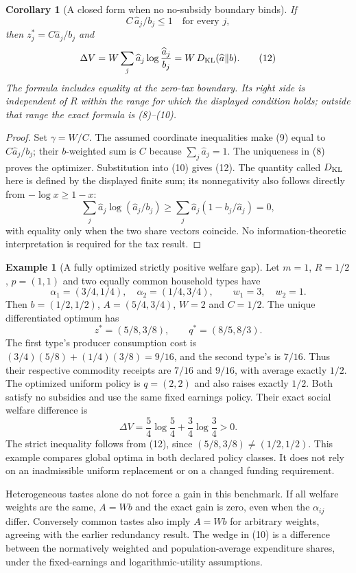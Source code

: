 \documentclass[11pt]{article}
\newtheorem{corollary}{Corollary}
\theoremstyle{definition}
\newtheorem{example}{Example}
\begin{document}
\begin{corollary}[A closed form when no no-subsidy boundary binds]
If
\[
 C\,\widehat a_j/b_j\leq1\quad\text{for every }j,
\]
then $z_j^*=C\widehat a_j/b_j$ and
\[
 \Delta V
 =W\sum_j\widehat a_j\log\frac{\widehat a_j}{b_j}
 =W\,D_{\rm KL}(\widehat a\Vert b).                        \tag{12}
\]
The formula includes equality at the zero-tax boundary. Its right side
is independent of $R$ within the range for which the displayed condition
holds; outside that range the exact formula is (8)--(10).
\end{corollary}
\begin{proof}
Set $\gamma=W/C$. The assumed coordinate inequalities make (9) equal
to $C\widehat a_j/b_j$; their $b$-weighted sum is $C$ because
$\sum_j\widehat a_j=1$. The uniqueness in (8) proves the optimizer.
Substitution into (10) gives (12). The quantity called
$D_{\rm KL}$ here is defined by the displayed finite sum; its
nonnegativity also follows directly from $-\log x\geq1-x$:
\[
 \sum_j\widehat a_j\log(\widehat a_j/b_j)
 \geq\sum_j\widehat a_j(1-b_j/\widehat a_j)=0,
\]
with equality only when the two share vectors coincide. No
information-theoretic interpretation is required for the tax result.
\end{proof}

\begin{example}[A fully optimized strictly positive welfare gap]
Let $m=1$, $R=1/2$, $p=(1,1)$ and two equally common household
types have
\[
 \alpha_1=(3/4,1/4),\quad \alpha_2=(1/4,3/4),\qquad
 w_1=3,\quad w_2=1.
\]
Then $b=(1/2,1/2)$, $A=(5/4,3/4)$, $W=2$ and $C=1/2$.
The unique differentiated optimum has
\[
 z^*=(5/8,3/8),\qquad q^*=(8/5,8/3).
\]
The first type's producer consumption cost is
$(3/4)(5/8)+(1/4)(3/8)=9/16$, and the second type's is $7/16$.
Thus their respective commodity receipts are $7/16$ and $9/16$,
with average exactly $1/2$. The optimized uniform policy is
$q=(2,2)$ and also raises exactly $1/2$. Both satisfy no subsidies
and use the same fixed earnings policy. Their exact social welfare
difference is
\[
 \Delta V=\frac54\log\frac54+\frac34\log\frac34>0.
\]
The strict inequality follows from (12), since $(5/8,3/8)\ne(1/2,1/2)$.
This example compares global optima in both declared policy classes.
It does not rely on an inadmissible uniform replacement or on a changed
funding requirement.
\end{example}

Heterogeneous tastes alone do not force a gain in this benchmark.
If all welfare weights are the same, $A=Wb$ and the exact gain is
zero, even when the $\alpha_{ij}$ differ. Conversely common tastes
also imply $A=Wb$ for arbitrary weights, agreeing with the earlier
redundancy result. The wedge in (10) is a difference between the
normatively weighted and population-average expenditure shares,
under the fixed-earnings and logarithmic-utility assumptions.
\end{document}
